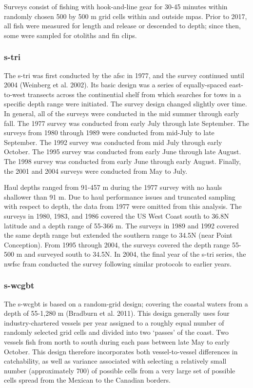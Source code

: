 \documentclass[11pt,
  english,
  letterpaper,
]{article}
\begin{document}
Surveys consist of fishing with hook-and-line gear for 30-45 minutes within randomly chosen 500 by 500 m grid cells within and outside \glspl{mpa}. Prior to 2017, all fish were measured for length and release or descended to depth; since then, some were sampled for otoliths and fin clips.

\hypertarget{section-2}{%
\subsubsection{\texorpdfstring{\acrlong{s-tri}}{}}\label{section-2}}

The \gls{s-tri} was first conducted by the \gls{afsc} in 1977, and the survey continued until 2004 (Weinberg et al. 2002). Its basic design was a series of equally-spaced east-to-west transects across the continential shelf from which searches for tows in a specific depth range were initiated. The survey design changed slightly over time. In general, all of the surveys were conducted in the mid summer through early fall. The 1977 survey was conducted from early July through late September. The surveys from 1980 through 1989 were conducted from mid-July to late September. The 1992 survey was conducted from mid July through early October. The 1995 survey was conducted from early June through late August. The 1998 survey was conducted from early June through early August. Finally, the 2001 and 2004 surveys were conducted from May to July.

Haul depths ranged from 91-457 m during the 1977 survey with no hauls shallower than 91 m. Due to haul performance issues and truncated sampling with respect to depth, the data from 1977 were omitted from this analysis. The surveys in 1980, 1983, and 1986 covered the US West Coast south to 36.8\textdegree N latitude and a depth range of 55-366 m. The surveys in 1989 and 1992 covered the same depth range but extended the southern range to 34.5\textdegree N (near Point Conception). From 1995 through 2004, the surveys covered the depth range 55-500 m and surveyed south to 34.5\textdegree N. In 2004, the final year of the \gls{s-tri} series, the \gls{nwfsc} \gls{fram} conducted the survey following similar protocols to earlier years.

\hypertarget{section-3}{%
\subsubsection{\texorpdfstring{\acrlong{s-wcgbt}}{}}\label{section-3}}

The \Gls{s-wcgbt} is based on a random-grid design; covering the coastal waters from a depth of 55-1,280 m (Bradburn et al. 2011). This design generally uses four industry-chartered vessels per year assigned to a roughly equal number of randomly selected grid cells and divided into two `passes' of the coast. Two vessels fish from north to south during each pass between late May to early October. This design therefore incorporates both vessel-to-vessel differences in catchability, as well as variance associated with selecting a relatively small number (approximately 700) of possible cells from a very large set of possible cells spread from the Mexican to the Canadian borders.
\end{document}
